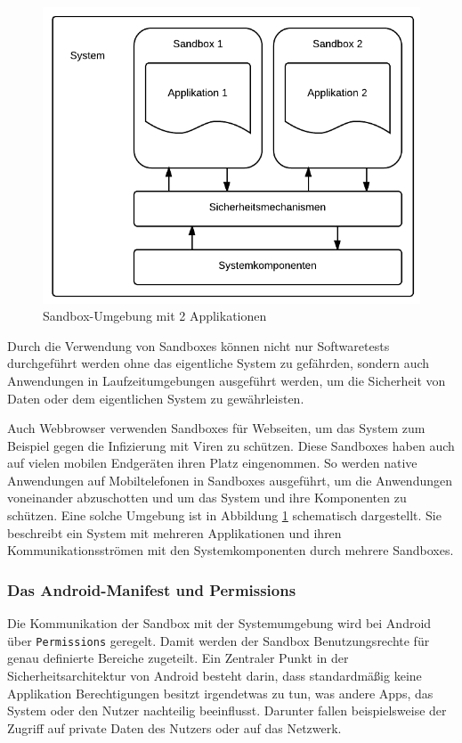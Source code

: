 \begin{figure}[ht!]
\begin{center}
\includegraphics[scale=0.4]{images/sandbox}
\caption{Sandbox-Umgebung mit 2 Applikationen}
\label{sandbox_pic}
\end{center}
\end{figure}

Durch die Verwendung von Sandboxes können nicht nur Softwaretests durchgeführt werden ohne das eigentliche System zu gefährden, sondern auch Anwendungen in Laufzeitumgebungen ausgeführt werden, um die Sicherheit von Daten oder dem eigentlichen System zu gewährleisten. 

Auch Webbrowser verwenden Sandboxes für Webseiten, um das System zum Beispiel gegen die Infizierung mit Viren zu schützen. Diese Sandboxes haben auch auf vielen mobilen Endgeräten ihren Platz eingenommen. So werden native Anwendungen auf Mobiltelefonen in Sandboxes ausgeführt, um die Anwendungen voneinander abzuschotten und um das System und ihre Komponenten zu schützen. Eine solche Umgebung ist in Abbildung \ref{sandbox_pic} schematisch dargestellt. Sie beschreibt ein System mit mehreren Applikationen und ihren Kommunikationsströmen mit den Systemkomponenten durch mehrere Sandboxes.

\subsubsection{Das Android-Manifest und Permissions}

Die Kommunikation der Sandbox mit der Systemumgebung wird bei Android über \verb+Permissions+ geregelt. Damit werden der Sandbox Benutzungsrechte für genau definierte Bereiche zugeteilt. 
Ein Zentraler Punkt in der Sicherheitsarchitektur von Android besteht darin, dass standardmäßig keine Applikation Berechtigungen besitzt irgendetwas zu tun, was andere Apps, das System oder den Nutzer nachteilig beeinflusst. Darunter fallen beispielsweise der Zugriff auf private Daten des Nutzers oder auf das Netzwerk.

